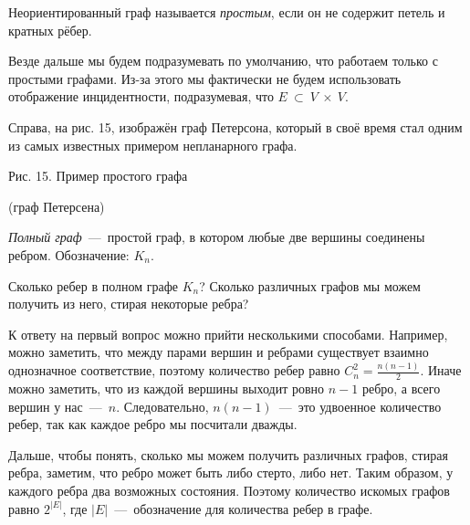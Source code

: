 \begin{paracol}{2}
\begin{definition}
	Неориентированный граф называется \emph{простым}, если он не содержит петель и кратных рёбер.
\end{definition}

	Везде дальше мы будем подразумевать по умолчанию, что работаем только с простыми графами. Из-за этого мы фактически не будем использовать отображение инцидентности, подразумевая, что $E~\subset~V~\times~V$.
	
	Справа, на рис. 15, изображён граф Петерсона, который в своё время стал одним из самых известных примером непланарного графа.
\switchcolumn
\begin{center}\end{center}
\begin{center}
	\small Рис. 15. Пример простого графа 
	
	(граф Петерсена)
\end{center}
\end{paracol}

\begin{definition}
	\emph{Полный граф}~---~простой граф, в котором любые две вершины соединены ребром. Обозначение: $K_n$.
\end{definition}

\begin{example}
	Сколько ребер в полном графе $K_n$? Сколько различных графов мы можем получить из него, стирая некоторые ребра?
	
	К ответу на первый вопрос можно прийти несколькими способами. Например, можно заметить, что между парами вершин и ребрами существует взаимно однозначное соответствие, поэтому количество ребер равно $C_n^2 = \frac{n(n-1)}{2}$. Иначе можно заметить, что из каждой вершины выходит ровно $n - 1$ ребро, а всего вершин у нас~---~$n$. Следовательно, $n(n-1)$~---~это удвоенное количество ребер, так как каждое ребро мы посчитали дважды.
	
	Дальше, чтобы понять, сколько мы можем получить различных графов, стирая ребра, заметим, что ребро может быть либо стерто, либо нет. Таким образом, у каждого ребра два возможных состояния. Поэтому количество искомых графов равно $2^{|E|}$, где $|E|$~---~обозначение для количества ребер в графе. 
\end{example}

